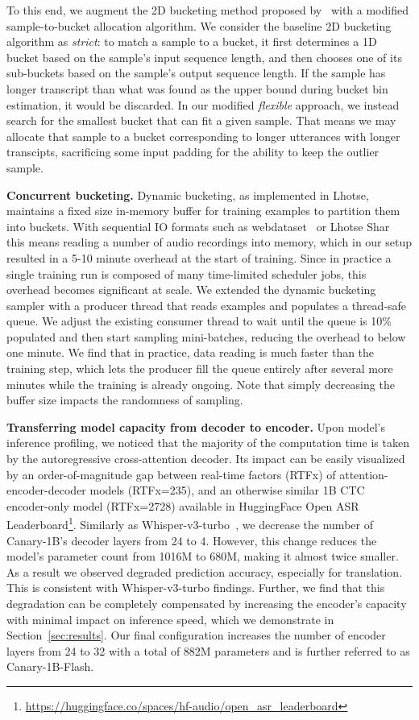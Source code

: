 \documentclass[11pt]{article}
\begin{document}
To this end, we augment the 2D bucketing method proposed by~\citet{zelasko2024emmett} with a modified sample-to-bucket allocation algorithm. We consider the baseline 2D bucketing algorithm as \textit{strict}: to match a sample to a bucket, it first determines a 1D bucket based on the sample's input sequence length, and then chooses one of its sub-buckets based on the sample's output sequence length. If the sample has longer transcript than what was found as the upper bound during bucket bin estimation, it would be discarded. In our modified \textit{flexible} approach, we instead search for the smallest bucket that can fit a given sample. That means we may allocate that sample to a bucket corresponding to longer utterances with longer transcipts, sacrificing some input padding for the ability to keep the outlier sample.

\textbf{Concurrent bucketing.}
Dynamic bucketing, as implemented in Lhotse, maintains a fixed size in-memory buffer for training examples to partition them into buckets. 
With sequential IO formats such as webdataset~\cite{webdataset} or Lhotse Shar~\cite{zelasko2021lhotse} this means reading a number of audio recordings into memory, which in our setup resulted in a 5-10 minute overhead at the start of training. 
Since in practice a single training run is composed of many time-limited scheduler jobs, this overhead becomes significant at scale.
We extended the dynamic bucketing sampler with a producer thread that reads examples and populates a thread-safe queue. 
We adjust the existing consumer thread to wait until the queue is 10\% populated and then start sampling mini-batches, reducing the overhead to below one minute.
We find that in practice, data reading is much faster than the training step, which lets the producer fill the queue entirely after several more minutes while the training is already ongoing.
Note that simply decreasing the buffer size impacts the randomness of sampling.

\textbf{Transferring model capacity from decoder to encoder.} 
Upon model's inference profiling, we noticed that the majority of the computation time is taken by the autoregressive cross-attention decoder. 
Its impact can be easily visualized by an order-of-magnitude gap between real-time factors (RTFx) of attention-encoder-decoder models (RTFx=235), and an otherwise similar 1B CTC~\cite{graves2006connectionist} encoder-only model (RTFx=2728) available in HuggingFace Open ASR Leaderboard\footnote{\url{https://huggingface.co/spaces/hf-audio/open_asr_leaderboard}}. 
Similarly as Whisper-v3-turbo~\cite{radford2022robustspeechrecognitionlargescale}, we decrease the number of Canary-1B's decoder layers from 24 to 4. 
However, this change reduces the model's parameter count from 1016M to 680M, making it almost twice smaller. 
As a result we observed degraded prediction accuracy, especially for translation. 
This is consistent with Whisper-v3-turbo findings. 
Further, we find that this degradation can be completely compensated by increasing the encoder's capacity with minimal impact on inference speed, which we demonstrate in Section~\ref{sec:results}. 
Our final configuration increases the number of encoder layers from 24 to 32 with a total of 882M parameters and is further referred to as Canary-1B-Flash.
\end{document}
